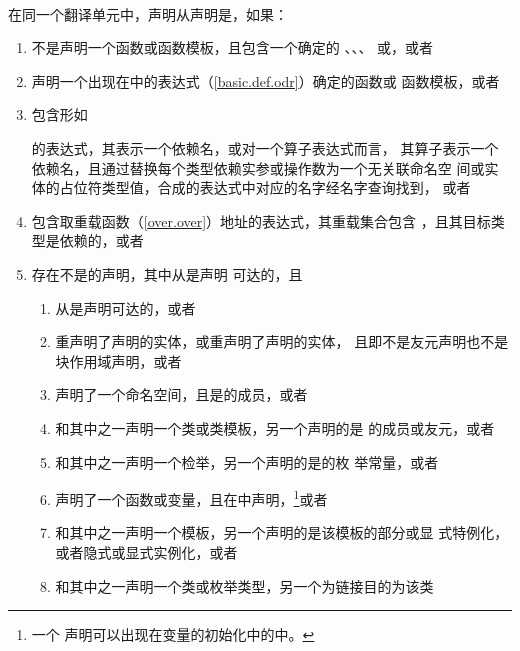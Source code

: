\paragraph{} %
在同一个翻译单元中，声明从声明是，如果：
\begin{enumerate}
  \item {}不是声明一个函数或函数模板，且包含一个确定的
    、、、
    或，或者
  \item {}声明一个出现在中的表达式（\ref{basic.def.odr}）确定的函数或
    函数模板，或者
  \item {}包含形如\par\qquad
       \tm{(}  \tm{)}\par
    的表达式，其表示一个依赖名，或对一个算子表达式而言，
    其算子表示一个依赖名，且通过替换每个类型依赖实参或操作数为一个无关联命名空
    间或实体的占位符类型值，合成的表达式中对应的名字经名字查询找到，
    或者
  \item {}包含取重载函数（\ref{over.over}）地址的表达式，其重载集合包含
    ，且其目标类型是依赖的，或者
  \item 存在不是的声明，其中从是声明
    可达的，且
    \begin{enumerate}
      \item {}从是声明可达的，或者
      \item {}重声明了声明的实体，或重声明了声明的实体，
        且即不是友元声明也不是块作用域声明，或者
      \item {}声明了一个命名空间，且是的成员，或者
      \item {}和其中之一声明一个类或类模板，另一个声明的是
        的成员或友元，或者
      \item {}和其中之一声明一个检举，另一个声明的是的枚
        举常量，或者
      \item {}声明了一个函数或变量，且在中声明，\footnote{一个
        声明可以出现在变量的初始化中的中。}或者
      \item {}和其中之一声明一个模板，另一个声明的是该模板的部分或显
        式特例化，或者隐式或显式实例化，或者
      \item {}和其中之一声明一个类或枚举类型，另一个为链接目的为该类

\end{enumerate}
\end{enumerate}
